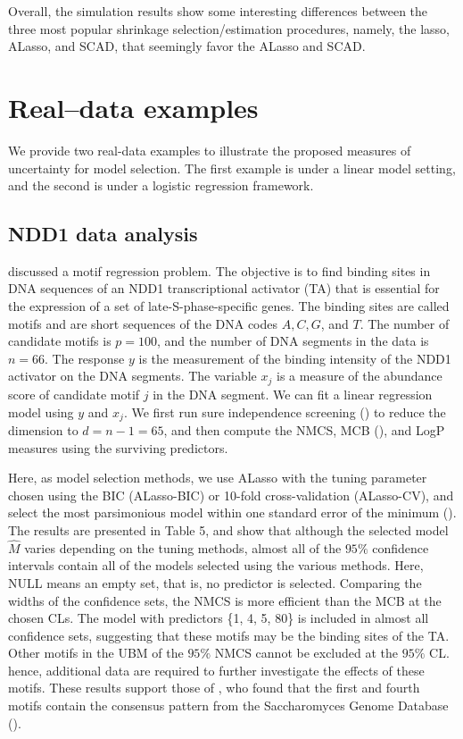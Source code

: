 \documentclass[12pt]{article} %
\theoremstyle{definition}
\begin{document}
Overall, the simulation results show some interesting differences between the three most popular shrinkage selection/estimation procedures, namely, the lasso, ALasso, and SCAD, that seemingly favor the ALasso and SCAD.



\section{Real–data examples}
\hspace{4mm}
We provide two real-data examples to illustrate the proposed measures of uncertainty for model selection. The first example is under a linear model setting, and the second is under a logistic regression framework.
\subsection{NDD1 data analysis}
\hspace{4mm}
\cite{Conlon2003} discussed a motif regression problem. The objective is to find binding sites in DNA sequences of an NDD1 transcriptional activator (TA) that is essential for the expression of a set of late-S-phase-specific genes. The binding sites are called motifs and are short sequences of the DNA codes $A, C, G$, and $T$. The number of candidate motifs is $p=100$, and the number of DNA segments in the data is $n=66$. The response $y$ is the measurement of the binding intensity of the NDD1 activator on the DNA segments. The variable $x_j$ is a measure of the abundance score of candidate motif $j$ in the DNA segment. We can fit a linear regression model using $y$ and $x_j$. We first run sure independence screening (\citet{fan2008}) to reduce the dimension to $d=n-1=65$, and then compute the NMCS, MCB (\citet{Li2019}), and LogP measures using the surviving predictors.

Here, as model selection methods, we use ALasso with the tuning parameter chosen using the BIC (ALasso-BIC) or 10-fold cross-validation (ALasso-CV), and select the most parsimonious model within
one standard error of the minimum (\citet{Hastie2001}). The results are presented in Table 5, and show that although the selected model $\hat{M}$ varies depending on the tuning methods, almost all of the $95\%$ confidence intervals contain all of the models selected using the various methods. Here, NULL means an empty set, that is, no predictor is selected. Comparing the widths of the confidence sets, the NMCS is more efficient than the MCB at the chosen CLs. The model with predictors \{1, 4, 5, 80\} is included in almost all confidence sets, suggesting that these motifs may be the binding sites of the TA. Other motifs in the UBM of the $95\%$ NMCS cannot be excluded at the $95\%$ CL. hence, additional data are required to further investigate the effects of these motifs. These results support those of \citet{Pang2016}, who found that the first and fourth motifs contain the consensus pattern
from the Saccharomyces Genome Database (\citet{ch2008}).
\end{document}
